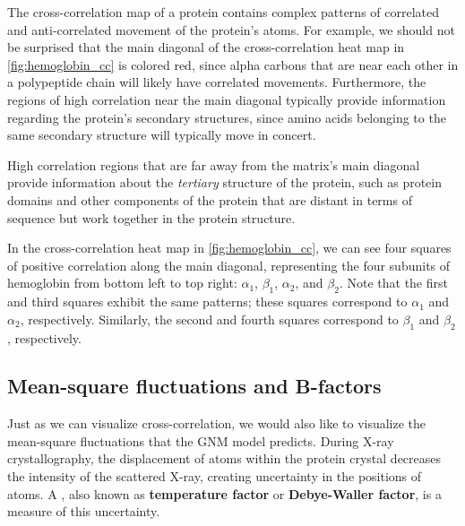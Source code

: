 The cross-correlation map of a protein contains complex patterns of correlated and anti-correlated movement of the protein's atoms. For example, we should not be surprised that the main diagonal of the cross-correlation heat map in \autoref{fig:hemoglobin_cc} is colored red, since alpha carbons that are near each other in a polypeptide chain will likely have correlated movements. Furthermore, the regions of high correlation near the main diagonal typically provide information regarding the protein's secondary structures, since amino acids belonging to the same secondary structure will typically move in concert.

High correlation regions that are far away from the matrix's main diagonal provide information about the \textit{tertiary} structure of the protein, such as protein domains and other components of the protein that are distant in terms of sequence but work together in the protein structure.

In the cross-correlation heat map in \autoref{fig:hemoglobin_cc}, we can see four squares of positive correlation along the main diagonal, representing the four subunits of hemoglobin from bottom left to top right: $\alpha_1$, $\beta_1$, $\alpha_2$, and $\beta_2$. Note that the first and third squares exhibit the same patterns; these squares correspond to $\alpha_1$ and $\alpha_2$, respectively. Similarly, the second and fourth squares correspond to $\beta_1$ and $\beta_2$, respectively.\\

\begin{qbox}\end{qbox}

\FloatBarrier
{}
\subsection{Mean-square fluctuations and B-factors}

Just as we can visualize cross-correlation, we would also like to visualize the mean-square fluctuations that the GNM model predicts. During X-ray crystallography, the displacement of atoms within the protein crystal decreases the intensity of the scattered X-ray, creating uncertainty in the positions of atoms. A , also known as \textbf{temperature factor} or \textbf{Debye-Waller factor}, is a measure of this uncertainty.

